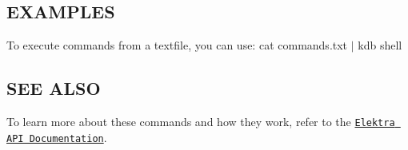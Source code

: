 \subsection*{E\+X\+A\+M\+P\+L\+ES}

To execute commands from a textfile, you can use\+: {\ttfamily cat commands.\+txt $\vert$ kdb shell}

\subsection*{S\+EE A\+L\+SO}

To learn more about these commands and how they work, refer to the \href{https://doc.libelektra.org/api/current/html}{\tt Elektra A\+PI Documentation}. 